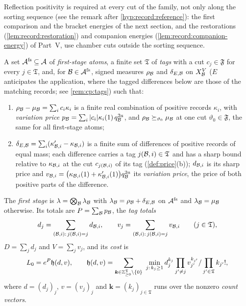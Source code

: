 Reflection positivity is required at every cut of the family, not only along
the sorting sequence (see the remark after \cref{hyp:record:reference}): the
first comparison and the bracket energies of the next section, and the
restorations (\cref{lem:record:restoration}) and companion energies
(\cref{lem:record:companion-energy}) of Part~V, use chamber cuts outside the
sorting sequence.

\begin{definition}\label{def:cp2}
A set $\mathcal A^{\rm fs}\subseteq\mathcal A$ of \emph{first-stage atoms},
a finite set $\mathfrak T$ of \emph{tags} with a cut $c_j\in\mathfrak F$ for
every $j\in\mathfrak T$, and, for $\mathcal B\in\mathcal A^{\rm fs}$, signed
measures $\rho_{\mathcal B}$ and $\delta_{E,\mathcal B}$ on $X_{\mathcal B}^V$ ($E$ anticipates
the application, where the tagged differences below are those of the
matching records; see \cref{rem:cp:tags}) such that:
\begin{enumerate}[label=(\alph*)]
\item $\rho_{\mathcal B}-\mu_{\mathcal B}=\sum_ic_i\kappa_i$ is a finite real combination
 of positive records $\kappa_i$, with \emph{variation price}
 $p_{\mathcal B}=\sum_i|c_i|\kappa_i(1)\,q_{\mathcal B}^{2a}$, and
 $\rho_{\mathcal B}\succeq_{\vartheta_0}\mu_{\mathcal B}$ at one cut $\vartheta_0\in\mathfrak F$,
 the same for all first-stage atoms;
\item $\delta_{E,\mathcal B}=\sum_i(\kappa'_{\mathcal B,i}-\kappa_{\mathcal B,i})$ is a finite
 sum of differences of positive records of equal mass; each difference
 carries a tag $j(\mathcal B,i)\in\mathfrak T$ and has a sharp bound relative to
 $\kappa_{\mathcal B,i}$ at the cut $c_{j(\mathcal B,i)}$ of its tag
 (\cref{def:price}(b)); $d_{\mathcal B,i}$ is its sharp price and
 $v_{\mathcal B,i}=\bigl(\kappa_{\mathcal B,i}(1)+\kappa'_{\mathcal B,i}(1)\bigr)q_{\mathcal B}^{2a}$
 its \emph{variation price}, the price of both positive parts of the
 difference.
\end{enumerate}
The \emph{first stage} is $\lambda=\bigotimes_{\mathcal B}\lambda_{\mathcal B}$ with
$\lambda_{\mathcal B}=\rho_{\mathcal B}+\delta_{E,\mathcal B}$ on $\mathcal A^{\rm fs}$ and
$\lambda_{\mathcal B}=\mu_{\mathcal B}$ otherwise. Its totals are $P=\sum_\mathcal B p_{\mathcal B}$,
the \emph{tag totals}
\[
 d_j=\sum_{(\mathcal B,i):\,j(\mathcal B,i)=j}d_{\mathcal B,i},\qquad
 v_j=\sum_{(\mathcal B,i):\,j(\mathcal B,i)=j}v_{\mathcal B,i}\qquad(j\in\mathfrak T),
\]
$D=\sum_jd_j$ and $V=\sum_jv_j$, and its \emph{cost} is
\[
 L_0=e^P\mathfrak h(d,v),\qquad
 \mathfrak h(d,v)=\sum_{\boldsymbol k\in\mathbb Z_{\ge0}^{\mathfrak T}\setminus\{0\}}\
 \min_{j:\,k_j\ge1}d_j^{k_j}\prod_{j'\ne j}v_{j'}^{k_{j'}}/\prod_{j'\in\mathfrak T}k_{j'}!,
\]
where $d=(d_j)_j$, $v=(v_j)_j$ and $\boldsymbol k=(k_j)_{j\in\mathfrak T}$
runs over the nonzero \emph{count vectors}.
\end{definition}

